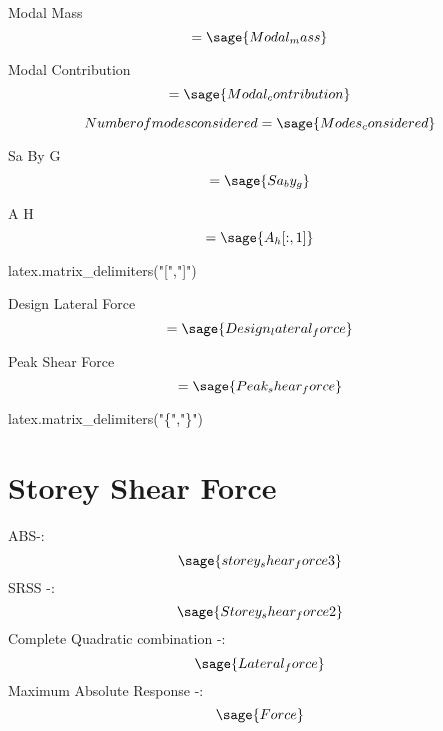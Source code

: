 \documentclass[12pt]{report}
\begin{document}
Modal Mass
\begin{equation}
	 [M_{{m}}]=\sage{Modal_mass}
\end{equation}

Modal Contribution
\begin{equation}
	[M_{{c}}]=\sage{Modal_contribution}
\end{equation}

\begin{equation}Number of modes considered=\sage{Modes_considered}
\end{equation}

Sa By G
\begin{equation}
	 [S_{{a}}]=\sage{Sa_by_g}
\end{equation}

A H
\begin{equation}
	[A_{{H}}]=\sage{A_h[:,1]}
\end{equation}

\begin{sagesilent}
latex.matrix_delimiters("[","]")

\end{sagesilent}
Design Lateral Force
\begin{equation}
	[F]=\sage{Design_lateral_force}
\end{equation}

Peak Shear Force
\begin{equation}
	[V]=\sage{Peak_shear_force}
\end{equation}


\begin{sagesilent}
latex.matrix_delimiters("\{","\}")
\end{sagesilent}

\section{Storey Shear Force}
ABS-:
\begin{equation}
	\sage{storey_shear_force3}
\end{equation}
SRSS -:
\begin{equation}
	\sage{Storey_shear_force2}
\end{equation}
Complete Quadratic combination -:
\begin{equation}
	\sage{Lateral_force}
\end{equation}
Maximum Absolute Response -:
\begin{equation}
	\sage{Force}
\end{equation}
\end{document}
